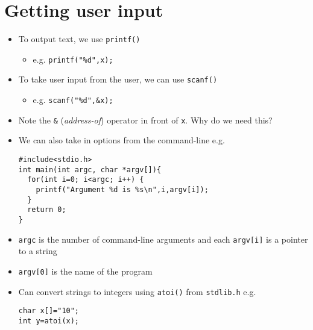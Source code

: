 \documentclass{article}
\begin{document}
\section{Getting user input}
\begin{itemize}
\item To output text, we use \verb!printf()!
\begin{itemize}
\item e.g. \verb!printf("%d",x);!
\end{itemize}
\item To take user input from the user, we can use \verb!scanf()!
\begin{itemize}
\item e.g. \verb!scanf("%d",&x);!
\end{itemize}
\item Note the \verb!&! (\emph{address-of}) operator in front of \verb!x!. Why do we need this?
\item We can also take in options from the command-line e.g.
\begin{verbatim}
#include<stdio.h>
int main(int argc, char *argv[]){
  for(int i=0; i<argc; i++) {
    printf("Argument %d is %s\n",i,argv[i]);
  }
  return 0;
}
\end{verbatim}
\item \verb!argc! is the number of command-line arguments and each \verb!argv[i]! is a pointer to a string
\item \verb!argv[0]! is the name of the program
\item Can convert strings to integers using \verb!atoi()! from \verb!stdlib.h! e.g.
\begin{verbatim}
char x[]="10";
int y=atoi(x);
\end{verbatim}
\end{itemize}
\end{document}
